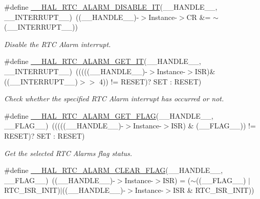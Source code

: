 \begin{DoxyCompactItemize}
\#define \hyperlink{group___r_t_c___exported___macros_gadc2d6dc4a75136bdd2b67c1b35d04b10}{\+\_\+\+\_\+\+H\+A\+L\+\_\+\+R\+T\+C\+\_\+\+A\+L\+A\+R\+M\+\_\+\+D\+I\+S\+A\+B\+L\+E\+\_\+\+IT}(\+\_\+\+\_\+\+H\+A\+N\+D\+L\+E\+\_\+\+\_\+,  \+\_\+\+\_\+\+I\+N\+T\+E\+R\+R\+U\+P\+T\+\_\+\+\_\+)~((\+\_\+\+\_\+\+H\+A\+N\+D\+L\+E\+\_\+\+\_\+)-\/$>$Instance-\/$>$CR \&= $\sim$(\+\_\+\+\_\+\+I\+N\+T\+E\+R\+R\+U\+P\+T\+\_\+\+\_\+))
\begin{DoxyCompactList}\small\item\em Disable the R\+TC Alarm interrupt. \end{DoxyCompactList}\item 
\#define \hyperlink{group___r_t_c___exported___macros_gaf748b95b91cca959f79f441a90678c60}{\+\_\+\+\_\+\+H\+A\+L\+\_\+\+R\+T\+C\+\_\+\+A\+L\+A\+R\+M\+\_\+\+G\+E\+T\+\_\+\+IT}(\+\_\+\+\_\+\+H\+A\+N\+D\+L\+E\+\_\+\+\_\+,  \+\_\+\+\_\+\+I\+N\+T\+E\+R\+R\+U\+P\+T\+\_\+\+\_\+)~(((((\+\_\+\+\_\+\+H\+A\+N\+D\+L\+E\+\_\+\+\_\+)-\/$>$Instance-\/$>$I\+SR)\& ((\+\_\+\+\_\+\+I\+N\+T\+E\+R\+R\+U\+P\+T\+\_\+\+\_\+)$>$$>$ 4)) != R\+E\+S\+ET)? S\+ET \+: R\+E\+S\+ET)
\begin{DoxyCompactList}\small\item\em Check whether the specified R\+TC Alarm interrupt has occurred or not. \end{DoxyCompactList}\item 
\#define \hyperlink{group___r_t_c___exported___macros_ga9f908cb1fd0f270c66f5deed82e019de}{\+\_\+\+\_\+\+H\+A\+L\+\_\+\+R\+T\+C\+\_\+\+A\+L\+A\+R\+M\+\_\+\+G\+E\+T\+\_\+\+F\+L\+AG}(\+\_\+\+\_\+\+H\+A\+N\+D\+L\+E\+\_\+\+\_\+,  \+\_\+\+\_\+\+F\+L\+A\+G\+\_\+\+\_\+)~(((((\+\_\+\+\_\+\+H\+A\+N\+D\+L\+E\+\_\+\+\_\+)-\/$>$Instance-\/$>$I\+SR) \& (\+\_\+\+\_\+\+F\+L\+A\+G\+\_\+\+\_\+)) != R\+E\+S\+ET)? S\+ET \+: R\+E\+S\+ET)
\begin{DoxyCompactList}\small\item\em Get the selected R\+TC Alarm\textquotesingle{}s flag status. \end{DoxyCompactList}\item 
\#define \hyperlink{group___r_t_c___exported___macros_ga93d88df67428f617157346d7cbdb4069}{\+\_\+\+\_\+\+H\+A\+L\+\_\+\+R\+T\+C\+\_\+\+A\+L\+A\+R\+M\+\_\+\+C\+L\+E\+A\+R\+\_\+\+F\+L\+AG}(\+\_\+\+\_\+\+H\+A\+N\+D\+L\+E\+\_\+\+\_\+,  \+\_\+\+\_\+\+F\+L\+A\+G\+\_\+\+\_\+)~((\+\_\+\+\_\+\+H\+A\+N\+D\+L\+E\+\_\+\+\_\+)-\/$>$Instance-\/$>$I\+SR) = ($\sim$((\+\_\+\+\_\+\+F\+L\+A\+G\+\_\+\+\_\+) $\vert$ R\+T\+C\+\_\+\+I\+S\+R\+\_\+\+I\+N\+IT)$\vert$((\+\_\+\+\_\+\+H\+A\+N\+D\+L\+E\+\_\+\+\_\+)-\/$>$Instance-\/$>$I\+SR \& R\+T\+C\+\_\+\+I\+S\+R\+\_\+\+I\+N\+IT))
$$
\end{DoxyCompactItemize}
